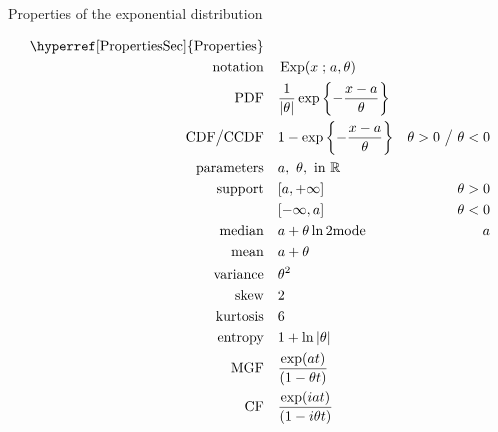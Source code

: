 

\begin{table*}[t!]
\caption[Exponential distribution -- Properties]{Properties of the exponential distribution}
\begin{align*}
\text{\hyperref[PropertiesSec]{Properties}}  \quad& \\
\text{notation} \quad & \op{Exp}(x\given a,\theta)					\checked
\\
\text{PDF}\quad &    \frac{1}{|\theta|} \exp\left\{-\frac{x-a}{\theta}\right\} 	\checked
\\
\text{CDF}\big  / \text{CCDF}  \quad  &   1- \exp\left\{-\frac{x-a}{\theta}\right\} & \theta>0 \ \big{/} \  \theta<0
\\
\text{parameters}\quad &   a,\ \theta, \text{ in } \Real 				\checked
\\
\text{support} \quad &   [ a, +\infty]      & \theta>0					\checked
\\
				&   [-\infty,  a]     & \theta <0					\checked
\\
\text{median} \quad  &  a + \theta \ln 2							\checked
\text{mode} \quad  & a										\checked
\\
\text{mean} \quad  &  a+ \theta									\checked						
\\
\text{variance} \quad  & \theta^2								\checked
\\
\text{skew} \quad  &  2										\checked
\\
\text{kurtosis} \quad  &  6										\checked
\\
\text{entropy} \quad  & 1 + \ln |\theta|							\checked
\\
\text{MGF} \quad  & \frac{\exp(at) }{ \left(1- \theta t\right)}				\checked
\\
\text{CF} \quad  & \frac{\exp(iat) }{ \left(1- i \theta t\right)}				\checked
\end{align*}
\end{table*}
